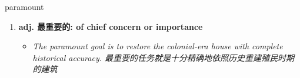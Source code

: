 
\begin{frame}
{\huge paramount}
\begin{center}
\begin{enumerate}\Large
  \item \textbf{adj. 最重要的: of chief concern or importance}
  \begin{itemize}
    \item \em{\Large{The paramount goal is to restore the colonial-era house with complete historical accuracy. 最重要的任务就是十分精确地依照历史重建殖民时期的建筑}}
  \end{itemize}
\end{enumerate}
\end{center}
\end{frame}
